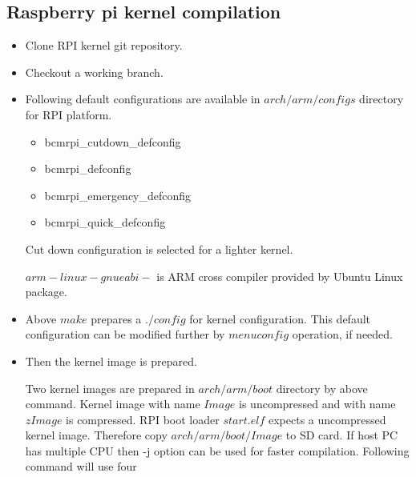 \subsection {Raspberry pi kernel compilation}
\begin{itemize}
	\item Clone RPI kernel git repository.\par
		 \par
	\item Checkout a working branch.\par
		 \par
	\item Following default configurations are available in
		$arch/arm/configs$ directory for RPI platform. 
		\begin{itemize}
			\item bcmrpi\_cutdown\_defconfig
			\item bcmrpi\_defconfig
			\item bcmrpi\_emergency\_defconfig
			\item bcmrpi\_quick\_defconfig
		\end{itemize}
		Cut down configuration is selected for a lighter
		kernel.\par
		 \par
		$arm-linux-gnueabi-$ is ARM cross compiler provided by Ubuntu Linux package.  
	\item Above $make$ prepares a $./config$ for kernel configuration.
		This default configuration can be modified further by
		$menuconfig$ operation, if needed.\par
		 \par
	\item Then the kernel image is prepared.\par
		 \par
		Two kernel images are prepared in $arch/arm/boot$ directory by
		above command. Kernel image with name $Image$ is
		uncompressed and with name $zImage$ is compressed. RPI
		boot loader $start.elf$ expects a uncompressed kernel
		image. Therefore copy $arch/arm/boot/Image$ to SD card.
		If host PC has multiple CPU then -j option can be used
		for faster compilation. Following command will use four

\end{itemize}

